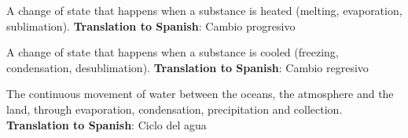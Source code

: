 \begin{vocabulary}
    A change of state that happens when a substance is heated (melting, evaporation, sublimation). \newline
    \textbf{Translation to Spanish}: Cambio progresivo
\end{vocabulary}

\begin{vocabulary}
    A change of state that happens when a substance is cooled (freezing, condensation, desublimation). \newline
    \textbf{Translation to Spanish}: Cambio regresivo
\end{vocabulary}

\begin{vocabulary}
    The continuous movement of water between the oceans, the atmosphere and the land, through evaporation, condensation, precipitation and collection. \newline
    \textbf{Translation to Spanish}: Ciclo del agua
\end{vocabulary}
